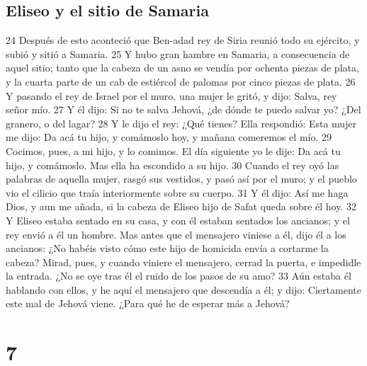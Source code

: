 \section*{Eliseo y el sitio de Samaria}

24 Después de esto aconteció que Ben-adad rey de Siria reunió todo su ejército, y subió y sitió a Samaria.
25 Y hubo gran hambre en Samaria, a consecuencia de aquel sitio; tanto que la cabeza de un asno se vendía por ochenta piezas de plata, y la cuarta parte de un cab de estiércol de palomas por cinco piezas de plata.
26 Y pasando el rey de Israel por el muro, una mujer le gritó, y dijo: Salva, rey señor mío.
27 Y él dijo: Si no te salva Jehová, ¿de dónde te puedo salvar yo? ¿Del granero, o del lagar?
28 Y le dijo el rey: ¿Qué tienes? Ella respondió: Esta mujer me dijo: Da acá tu hijo, y comámoslo hoy, y mañana comeremos el mío.
29 Cocimos, pues, a mi hijo, y lo comimos. El día siguiente yo le dije: Da acá tu hijo, y comámoslo. Mas ella ha escondido a su hijo.
30 Cuando el rey oyó las palabras de aquella mujer, rasgó sus vestidos, y pasó así por el muro; y el pueblo vio el cilicio que traía interiormente sobre su cuerpo.
31 Y él dijo: Así me haga Dios, y aun me añada, si la cabeza de Eliseo hijo de Safat queda sobre él hoy.
32 Y Eliseo estaba sentado en su casa, y con él estaban sentados los ancianos; y el rey envió a él un hombre. Mas antes que el mensajero viniese a él, dijo él a los ancianos: ¿No habéis visto cómo este hijo de homicida envía a cortarme la cabeza? Mirad, pues, y cuando viniere el mensajero, cerrad la puerta, e impedidle la entrada. ¿No se oye tras él el ruido de los pasos de su amo?
33 Aún estaba él hablando con ellos, y he aquí el mensajero que descendía a él; y dijo: Ciertamente este mal de Jehová viene. ¿Para qué he de esperar más a Jehová?

\chapter{7}


